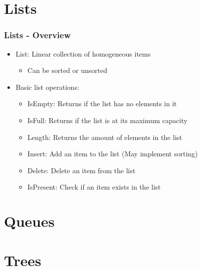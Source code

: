 \documentclass[c, aspectratio=169]{beamer}
\begin{document}
\section{Lists}
\begin{frame}\frametitle{Lists - Overview}
\begin{itemize}
\item List: Linear collection of homogeneous items
	\begin{itemize}
	\item Can be sorted or unsorted
	\end{itemize}
\item Basic list operations:
	\begin{itemize}
	\item IsEmpty: Returns if the list has no elements in it
	\item IsFull: Returns if the list is at its maximum capacity
	\item Length: Returns the amount of elements in the list
	\item Insert: Add an item to the list (May implement sorting)
	\item Delete: Delete an item from the list
	\item IsPresent: Check if an item exists in the list
	\end{itemize}
\end{itemize}
\end{frame}

\begin{frame}\end{frame}
\begin{frame}\end{frame}

\section{Queues}




\section{Trees}






\end{document}
